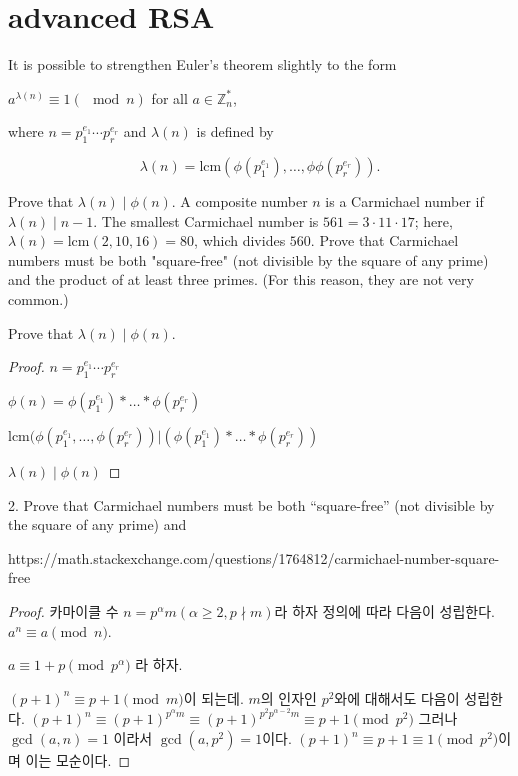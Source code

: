 \section{advanced RSA}

It is possible to strengthen Euler's theorem slightly to the form

$a^{\lambda(n)} \equiv 1 (\mod n)$ for all $a \in \mathbb Z_n^*$,

where $n = p_1^{e_1} \cdots p_r^{e_r}$ and $\lambda(n)$ is defined by

$$\lambda(n) = \text{lcm}(\phi(p_1^{e_1}), \ldots, \phi\phi(p_r^{e_r})). $$

Prove that $\lambda(n) \mid \phi(n)$. A composite number $n$ is a Carmichael number if $\lambda(n) \mid n - 1$. The smallest Carmichael number is $561 = 3 \cdot 11 \cdot 17$; here, $\lambda(n) = \text{lcm}(2, 10, 16) = 80$, which divides $560$. Prove that Carmichael numbers must be both "square-free" (not divisible by the square of any prime) and the product of at least three primes. (For this reason, they are not very common.)




Prove that $\lambda(n) \mid \phi(n)$.

\begin{proof}
    $n = p_1^{e_1} \cdots p_r^{e_r}$

    $ \phi(n) = \phi(p_1^{e_1})* \ldots*\phi(p_r^{e_r})$

    $\text{lcm}(\phi(p_1^{e_1}, \ldots, \phi(p_r^{e_r})) | (\phi(p_1^{e_1})* \ldots*\phi(p_r^{e_r}))$
    
    $\lambda(n) \mid \phi(n)$
\end{proof}




2. Prove that Carmichael numbers must be both “square-free” (not divisible by the square of any prime) and 

https://math.stackexchange.com/questions/1764812/carmichael-number-square-free


\begin{proof}
카마이클 수 $n = p^\alpha m( \alpha \ge 2 ,  p \nmid m )$라 하자
정의에 따라 다음이 성립한다. 
$a^{n} \equiv a \pmod{n}$.

$ a \equiv 1 + p \pmod{p^\alpha}$ 라 하자.

$(p+1)^{n} \equiv p+1 \pmod{m}$이 되는데. 
$m$의 인자인 $p^2$와에 대해서도 다음이 성립한다.
$(p+1)^{n} \equiv (p+1)^{p^\alpha m} \equiv (p+1)^{p^2 p^{\alpha-2} m}  \equiv p+1 \pmod{p^2}$
그러나 $\gcd(a,n) = 1$ 이라서 $\gcd(a, p^2) = 1$이다.
$(p+1)^{n} \equiv p+1  \equiv 1 \pmod{p^2}$이며 이는 모순이다.
\end{proof}

